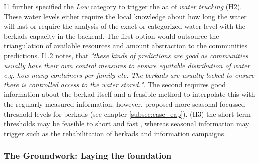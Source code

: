 I1 further specified the \textit{Low} category to trigger the \acrshort{aa} of \textit{water trucking} (H2). These water levels either require the local knowledge about how long the water will last or require the analysis of the exact or categorized water level with the berkads capacity in the backend. The first option would outsource the triangulation of available resources and amount abstraction to the communities predictions. I1.2 notes, that \textit{"these kinds of predictions are good as communities usually have their own control measures to ensure equitable distribution of water e.g. how many containers per family etc. The berkads are usually locked to ensure there is controlled access to the water stored."}. The second requires good information about the berkad itself and a feasible method to interpolate this with the regularly measured information. \autocite{gualazziniEWEAEarlyWarning2021} however, proposed more seasonal focussed threshold levels for berkads (see chapter \ref*{subsec:case_eap}). (H3) the short-term thresholds may be feasible to short and fast , whereas seasonal information may trigger  such as the rehabilitation of berkads and information campaigns.

\subsubsection{The Groundwork: Laying the foundation}\label{subsubsec:groundwork_appl}

